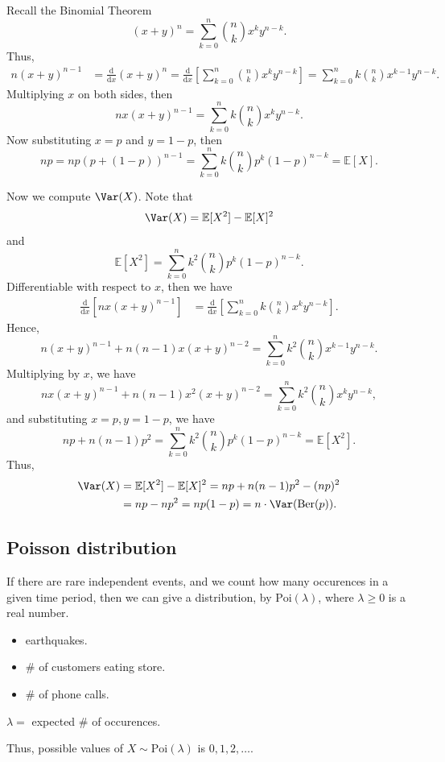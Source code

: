 Recall the Binomial Theorem
\[
    (x + y)^n = \sum_{k=0}^n \binom{n}{k} x^k y^{n-k}. 
\]
Thus,
\begin{align*}
    n(x + y)^{n - 1} &= \frac{\mathrm{d}}{\mathrm{d}x} (x + y)^n = \frac{\mathrm{d}}{\mathrm{d}x} \left[ \sum_{k=0}^n \binom{n}{k} x^k y^{n-k} \right] = \sum_{k=0}^n k \binom{n}{k} x^{k-1} y^{n - k}.  
\end{align*}
Multiplying \(x\) on both sides, then 
\[
    nx(x + y)^{n - 1} = \sum_{k=0}^n k \binom{n}{k} x^k y^{n - k}.  
\] 
Now substituting \(x = p\) and \(y = 1- p\), then 
\[
    np = np (p + (1 - p))^{n - 1} = \sum_{k=0}^n k \binom{n}{k} p^k (1 - p)^{n - k} = \mathbb{E} [X]. 
\]  

Now we compute \(\Var(X)\). Note that 
\[
    \Var(X) = \mathbb{E} [X^2] - \mathbb{E} [X]^2
\] 
and 
\[
    \mathbb{E} [X^2] = \sum_{k=0}^n k^2 \binom{n}{k} p^k (1 - p)^{n - k}. 
\]
Differentiable with respect to \(x\), then we have 
\begin{align*}
    \frac{\mathrm{d}}{\mathrm{d}x} \left[ nx(x + y)^{n - 1} \right] &= \frac{\mathrm{d}}{\mathrm{d}x} \left[ \sum_{k=0}^n k \binom{n}{k} x^k y^{n - k}  \right].    
\end{align*} 
Hence,
\[
    n(x + y)^{n - 1} + n(n - 1)x(x + y)^{n - 2} = \sum_{k=0}^n k^2 \binom{n}{k} x^{k - 1} y^{n - k}. 
\]
Multiplying by \(x\), we have 
\[
   nx(x + y)^{n - 1} + n(n - 1)x^2(x + y)^{n - 2} = \sum_{k=0}^n k^2 \binom{n}{k} x^{k} y^{n - k}, 
\] 
and substituting \(x = p, y = 1 - p\), we have 
\[
    np + n(n - 1)p^2 = \sum_{k=0}^n k^2 \binom{n}{k} p^k (1 - p)^{n - k} = \mathbb{E} [X^2]. 
\] 
Thus,
\begin{align*}
     \Var(X) &= \mathbb{E} [X^2] - \mathbb{E} [X]^2 = np + n(n - 1)p^2 - (np)^2 \\
     &= np - np^2 = np(1 - p) = n \cdot \Var(\mathrm{Ber}(p)).
\end{align*}

\subsection{Poisson distribution}

If there are rare independent events, and we count how many occurences in a given time period, then we can give a distribution, by \(\mathrm{Poi}(\lambda ) \), where \(\lambda \ge 0\) is a real number.  

\begin{eg}
    \hfill
    \begin{itemize}
        \item earthquakes. 
        \item \(\#\) of customers eating store. 
        \item \(\#\) of phone calls.  
    \end{itemize}
    \(\lambda =\) expected \(\#\) of occurences.  
\end{eg}

Thus, possible values of \(X \sim \mathrm{Poi}(\lambda ) \) is \(0, 1, 2, \dots \).  